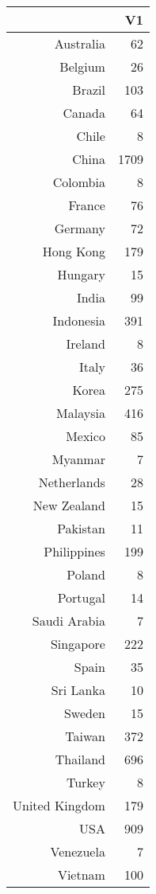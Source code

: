 \begin{tabular}{rr}
  \hline
 & V1 \\ 
  \hline
Australia &  62 \\ 
  Belgium &  26 \\ 
  Brazil & 103 \\ 
  Canada &  64 \\ 
  Chile &   8 \\ 
  China & 1709 \\ 
  Colombia &   8 \\ 
  France &  76 \\ 
  Germany &  72 \\ 
  Hong Kong & 179 \\ 
  Hungary &  15 \\ 
  India &  99 \\ 
  Indonesia & 391 \\ 
  Ireland &   8 \\ 
  Italy &  36 \\ 
  Korea & 275 \\ 
  Malaysia & 416 \\ 
  Mexico &  85 \\ 
  Myanmar &   7 \\ 
  Netherlands &  28 \\ 
  New Zealand &  15 \\ 
  Pakistan &  11 \\ 
  Philippines & 199 \\ 
  Poland &   8 \\ 
  Portugal &  14 \\ 
  Saudi Arabia &   7 \\ 
  Singapore & 222 \\ 
  Spain &  35 \\ 
  Sri Lanka &  10 \\ 
  Sweden &  15 \\ 
  Taiwan & 372 \\ 
  Thailand & 696 \\ 
  Turkey &   8 \\ 
  United Kingdom & 179 \\ 
  USA & 909 \\ 
  Venezuela &   7 \\ 
  Vietnam & 100 \\ 
   \hline
\end{tabular}
